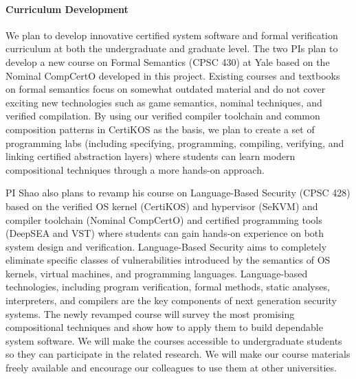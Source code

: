 \paragraph*{Curriculum Development}
We plan to develop innovative certified system software and formal
verification curriculum at both the undergraduate and graduate
level. The two PIs plan to develop a new course on Formal Semantics
(CPSC 430) at Yale based on the Nominal CompCertO developed in this
project. Existing courses and textbooks on formal semantics focus on
somewhat outdated material and do not cover exciting new technologies
such as game semantics, nominal techniques, and verified
compilation. By using our verified compiler toolchain and common
composition patterns in CertiKOS as the basis, we plan to
create a set of programming labs (including specifying, programming,
compiling, verifying, and linking certified abstraction layers) where
students can learn modern compositional techniques through a more
hands-on approach.

PI Shao also plans to revamp his course on Language-Based Security
(CPSC 428) based on the verified OS kernel (CertiKOS) and hypervisor
(SeKVM) and compiler toolchain (Nominal CompCertO) and certified
programming tools (DeepSEA and VST) where students can gain hands-on
experience on both system design and verification.  Language-Based
Security aims to completely eliminate specific classes of
vulnerabilities introduced by the semantics of OS
kernels, virtual machines, and programming languages. Language-based
technologies, including program verification, formal methods, static
analyses, interpreters, and compilers are the key
components of next generation security systems. The newly revamped
course will survey the most promising compositional
techniques and show how to apply them to build
dependable system software.  We will
make the courses accessible to undergraduate students so they
can participate in the related
research. We will make our course materials freely available and
encourage our colleagues to use them at other universities.

\vspace*{-2ex}
